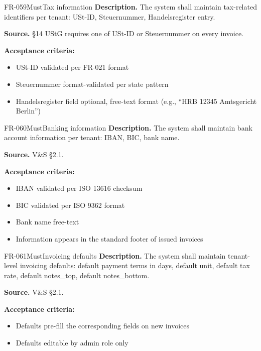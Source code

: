 \documentclass[11pt,a4paper]{article}
\begin{document}
\begin{requirement}{FR-059}{Must}{Tax information}
\textbf{Description.} The system shall maintain tax-related identifiers per tenant: USt-ID, Steuernummer, Handelsregister entry.

\textbf{Source.} \S14 UStG requires one of USt-ID or Steuernummer on every invoice.

\textbf{Acceptance criteria:}
\begin{itemize}
    \item USt-ID validated per FR-021 format
    \item Steuernummer format-validated per state pattern
    \item Handelsregister field optional, free-text format (e.g., ``HRB 12345 Amtsgericht Berlin'')
\end{itemize}
\end{requirement}

\begin{requirement}{FR-060}{Must}{Banking information}
\textbf{Description.} The system shall maintain bank account information per tenant: IBAN, BIC, bank name.

\textbf{Source.} V\&S \S2.1.

\textbf{Acceptance criteria:}
\begin{itemize}
    \item IBAN validated per ISO 13616 checksum
    \item BIC validated per ISO 9362 format
    \item Bank name free-text
    \item Information appears in the standard footer of issued invoices
\end{itemize}
\end{requirement}

\begin{requirement}{FR-061}{Must}{Invoicing defaults}
\textbf{Description.} The system shall maintain tenant-level invoicing defaults: default payment terms in days, default unit, default tax rate, default notes\_top, default notes\_bottom.

\textbf{Source.} V\&S \S2.1.

\textbf{Acceptance criteria:}
\begin{itemize}
    \item Defaults pre-fill the corresponding fields on new invoices
    \item Defaults editable by admin role only
\end{itemize}
\end{requirement}
\end{document}
